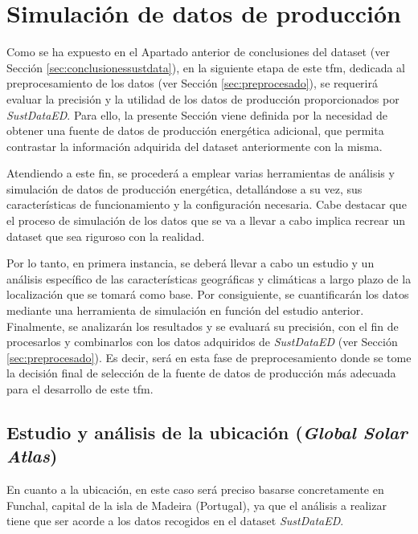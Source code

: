\section{Simulación de datos de producción}
\label{sec:simuprod}

Como se ha expuesto en el Apartado anterior de conclusiones del dataset (ver Sección \ref{sec:conclusionessustdata}), en la siguiente etapa de este \gls{tfm}, dedicada al preprocesamiento de los datos (ver Sección \ref{sec:preprocesado}), se requerirá evaluar la precisión y la utilidad de los datos de producción proporcionados por \textit{SustDataED}. Para ello, la presente Sección viene definida por la necesidad de obtener una fuente de datos de producción energética adicional, que permita contrastar la información adquirida del dataset anteriormente con la misma.

\vspace{3mm}

Atendiendo a este fin, se procederá a emplear varias herramientas de análisis y simulación de datos de producción energética, detallándose a su vez, sus características de funcionamiento y la configuración necesaria. Cabe destacar que el proceso de simulación de los datos que se va a llevar a cabo implica recrear un dataset que sea riguroso con la realidad.

\vspace{3mm}

Por lo tanto, en primera instancia, se deberá llevar a cabo un estudio y un análisis específico de las características geográficas y climáticas a largo plazo de la localización que se tomará como base. Por consiguiente, se cuantificarán los datos mediante una herramienta de simulación en función del estudio anterior. Finalmente, se analizarán los resultados y se evaluará su precisión, con el fin de procesarlos y combinarlos con los datos adquiridos de \textit{SustDataED} (ver Sección \ref{sec:preprocesado}). Es decir, será en esta fase de preprocesamiento donde se tome la decisión final de selección de la fuente de datos de producción más adecuada para el desarrollo de este \gls{tfm}.

\subsection{Estudio y análisis de la ubicación (\textit{Global Solar Atlas})}
\label{sec:global}

En cuanto a la ubicación, en este caso será preciso basarse concretamente en Funchal, capital de la isla de Madeira (Portugal), ya que el análisis a realizar tiene que ser acorde a los datos recogidos en el dataset \textit{SustDataED}. 

